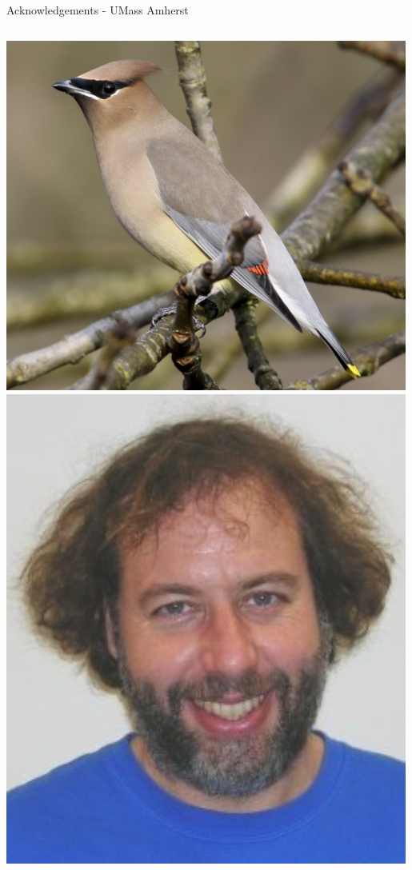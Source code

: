 \documentclass[aspectratio=169]{beamer}
\begin{document}
\begin{frame}{Acknowledgements - UMass Amherst}
\begin{columns}
            \centering
            \includegraphics[width=0.99\textwidth]{people/umassprofs/tami.png}
            \includegraphics[width=0.99\textwidth]{people/umassprofs/kusner.png}

\end{columns}
\end{frame}
\end{document}
